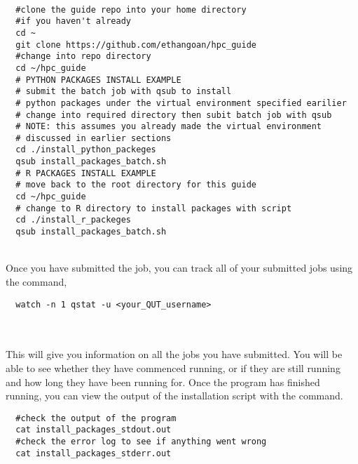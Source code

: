 %
%
\\
\par
\begin{verbatim}
  #clone the guide repo into your home directory
  #if you haven't already
  cd ~
  git clone https://github.com/ethangoan/hpc_guide
  #change into repo directory
  cd ~/hpc_guide
  # PYTHON PACKAGES INSTALL EXAMPLE
  # submit the batch job with qsub to install
  # python packages under the virtual environment specified earilier
  # change into required directory then subit batch job with qsub
  # NOTE: this assumes you already made the virtual environment
  # discussed in earlier sections
  cd ./install_python_packeges
  qsub install_packages_batch.sh
  # R PACKAGES INSTALL EXAMPLE
  # move back to the root directory for this guide
  cd ~/hpc_guide
  # change to R directory to install packages with script
  cd ./install_r_packeges
  qsub install_packages_batch.sh
\end{verbatim}
\\
%
Once you have submitted the job, you can track all of your submitted jobs using the command,
%
\\
\par
\begin{verbatim}
  watch -n 1 qstat -u <your_QUT_username>
\end{verbatim}
%
\\
\\
%
This will give you information on all the jobs you have submitted. You will be able to see whether they have commenced running, or if they are still running and how long they have been running for. Once the program has finished running, you can view the output of the installation script with the  command.
\\
\par
\begin{verbatim}
  #check the output of the program
  cat install_packages_stdout.out
  #check the error log to see if anything went wrong
  cat install_packages_stderr.out
\end{verbatim}
%
%
%
